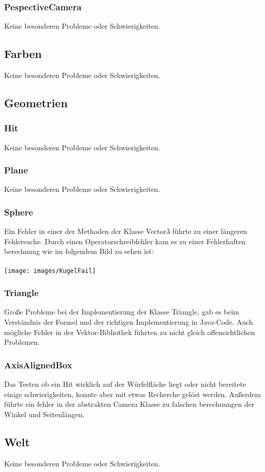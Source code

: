 \documentclass[14pt]{extarticle}
\begin{document}
\subsubsection{PespectiveCamera}
Keine besonderen Probleme oder Schwierigkeiten.
\subsection{Farben}
Keine besonderen Probleme oder Schwierigkeiten.
\subsection{Geometrien}
\subsubsection{Hit}
Keine besonderen Probleme oder Schwierigkeiten.
\subsubsection{Plane}
Keine besonderen Probleme oder Schwierigkeiten.
\subsubsection{Sphere}
Ein Fehler in einer der Methoden der Klasse Vector3 führte zu einer längeren Fehlersuche. Durch einen Operatorschreibfehler kam es zu einer Fehlerhaften berechnung wie im folgendem Bild zu sehen ist:\\\\
\texttt{[image: images/KugelFail]}
\subsubsection{Triangle}
Große Probleme bei der Implementierung der Klasse Triangle, gab es beim Verständnis der Formel und der richtigen Implementierung in Java-Code. Auch mögliche Fehler in der Vektor-Bibliothek führten zu nicht gleich offensichtlichen Problemen. 
\subsubsection{AxisAlignedBox}
Das Testen ob ein Hit wirklich auf der Würfelfläche liegt oder nicht bereitete einige schwierigkeiten, konnte aber mit etwas Recherche gelöst werden. Außerdem führte ein fehler in der abstrakten Camera Klasse zu falschen berechnungen der Winkel und Seitenlängen.
\subsection{Welt}
Keine besonderen Probleme oder Schwierigkeiten.
\end{document}
